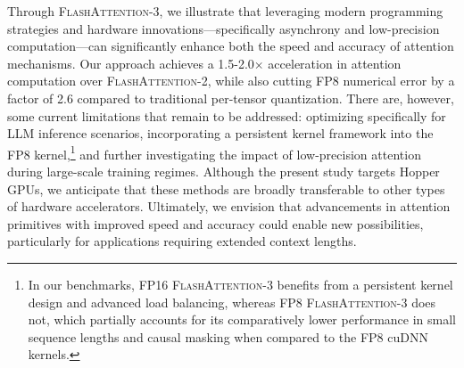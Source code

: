 Through \textsc{FlashAttention-3}, we illustrate that leveraging modern programming strategies and hardware innovations—specifically asynchrony and low-precision computation—can significantly enhance both the speed and accuracy of attention mechanisms. Our approach achieves a 1.5-2.0$\times$ acceleration in attention computation over \textsc{FlashAttention-2}, while also cutting FP8 numerical error by a factor of 2.6 compared to traditional per-tensor quantization. There are, however, some current limitations that remain to be addressed: optimizing specifically for LLM inference scenarios, incorporating a persistent kernel framework into the FP8 kernel,\footnote{In our benchmarks, FP16 \textsc{FlashAttention-3} benefits from a persistent kernel design and advanced load balancing, whereas FP8 \textsc{FlashAttention-3} does not, which partially accounts for its comparatively lower performance in small sequence lengths and causal masking when compared to the FP8 cuDNN kernels.} and further investigating the impact of low-precision attention during large-scale training regimes. Although the present study targets Hopper GPUs, we anticipate that these methods are broadly transferable to other types of hardware accelerators. Ultimately, we envision that advancements in attention primitives with improved speed and accuracy could enable new possibilities, particularly for applications requiring extended context lengths.

